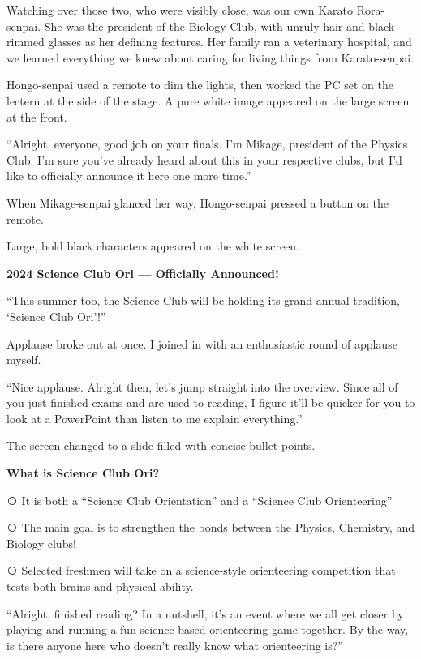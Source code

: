 \documentclass[
    a4paper,
    12pt,
    twoside,
    openany,
    UTF8,
    fontset=windows
]{ctexbook}
\newcommand{\circled}[1]{%
  \textcircled{\raisebox{-0.9pt}{\fontsize{9}{9}\selectfont #1}}%
}
\begin{document}
Watching over those two, who were visibly close, was our own Karato Rora-senpai. She was the president of the Biology Club, with unruly hair and black-rimmed glasses as her defining features. Her family ran a veterinary hospital, and we learned everything we knew about caring for living things from Karato-senpai.

Hongo-senpai used a remote to dim the lights, then worked the PC set on the lectern at the side of the stage. A pure white image appeared on the large screen at the front.

``Alright, everyone, good job on your finals. I'm Mikage, president of the Physics Club. I'm sure you've already heard about this in your respective clubs, but I'd like to officially announce it here one more time.''

When Mikage-senpai glanced her way, Hongo-senpai pressed a button on the remote.

Large, bold black characters appeared on the white screen.

\begin{center}
\textbf{2024 Science Club Ori --- Officially Announced!}
\end{center}

``This summer too, the Science Club will be holding its grand annual tradition, `Science Club Ori'!''

Applause broke out at once. I joined in with an enthusiastic round of applause myself.

``Nice applause. Alright then, let's jump straight into the overview. Since all of you just finished exams and are used to reading, I figure it'll be quicker for you to look at a PowerPoint than listen to me explain everything.''

The screen changed to a slide filled with concise bullet points.

\begin{center}
\textbf{What is Science Club Ori?}
\end{center}

\circled{1} It is both a ``Science Club Orientation'' and a ``Science Club Orienteering''

\circled{2} The main goal is to strengthen the bonds between the Physics, Chemistry, and Biology clubs!

\circled{3} Selected freshmen will take on a science-style orienteering competition that tests both brains and physical ability.

``Alright, finished reading? In a nutshell, it's an event where we all get closer by playing and running a fun science-based orienteering game together. By the way, is there anyone here who doesn't really know what orienteering is?''
\end{document}
